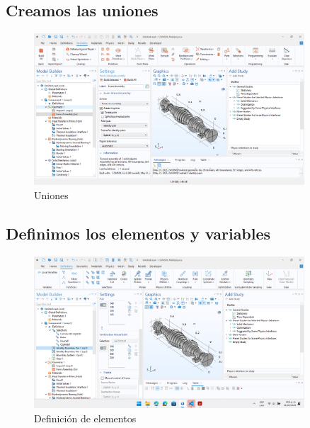\documentclass{article}
\theoremstyle{mytheoremstyle}
\theoremstyle{mytheoremstyle}
\theoremstyle{myproblemstyle}
\begin{document}
            \subsection{Creamos las uniones}
            \begin{figure}[H]
              \centering
              \includegraphics[width=0.9\textwidth]{uniones.png}
              \caption{Uniones}
              \label{fig:comsol_uniones} %
            \end{figure}

            \subsection{Definimos los elementos y variables}
            \begin{figure}[H]
              \centering
              \includegraphics[width=0.9\textwidth]{def_elem.png}
              \caption{Definición de elementos}
              \label{fig:comsol_parametros_geometria}
            \end{figure} %
\end{document}
